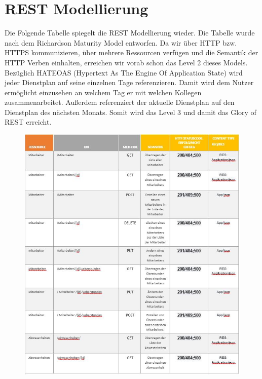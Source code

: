 \documentclass[11pt,
paper=a4,
bibtotocnumbered,	  %
liststotocnumbered,  %
DIV=calc,		  %
tablecaptionabove,	  %
headinclude,
]{article}
\begin{document}
\section{REST Modellierung}
Die Folgende Tabelle spiegelt die REST Modellierung wieder. Die Tabelle wurde nach dem Richardson Maturity Model entworfen. Da wir über HTTP bzw. HTTPS kommunizieren, über mehrere Ressourcen verfügen und die Semantik der HTTP Verben einhalten, erreichen wir vorab schon das Level 2 dieses Models. Bezüglich HATEOAS (Hypertext As The Engine Of Application State) wird jeder Dienstplan auf seine einzelnen Tage referenzieren. Damit wird dem Nutzer ermöglicht einzusehen an welchem Tag er mit welchen Kollegen zusammenarbeitet. Außerdem referenziert der aktuelle Dienstplan auf den Dienstplan des nächsten Monats. Somit wird das Level 3 und damit das Glory of REST erreicht.
\begin{figure}[H]
\includegraphics[width=1\textwidth]{Bilder/Rest1.jpg}
\end{figure}
\end{document}
